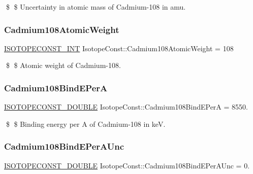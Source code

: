 \$ \$ Uncertainty in atomic mass of Cadmium-\/108 in amu. \mbox{\label{group___isotope_const-_cadmium-_cd108_gadc36c89b4044a011b0975d77445120d3}} 
\subsubsection{\texorpdfstring{Cadmium108\+Atomic\+Weight}{Cadmium108AtomicWeight}}
{\footnotesize\ttfamily \mbox{\hyperlink{group___isotope_const-_macros_ga5f18360b3e99483a35c32d789e62621c}{I\+S\+O\+T\+O\+P\+E\+C\+O\+N\+S\+T\+\_\+\+I\+NT}} Isotope\+Const\+::\+Cadmium108\+Atomic\+Weight = 108}

\$ \$ Atomic weight of Cadmium-\/108. \mbox{\label{group___isotope_const-_cadmium-_cd108_ga8949bc4e472612179144539664686152}} 
\subsubsection{\texorpdfstring{Cadmium108\+Bind\+E\+PerA}{Cadmium108BindEPerA}}
{\footnotesize\ttfamily \mbox{\hyperlink{group___isotope_const-_macros_ga8f45a7272ce02c0b4c65c44636ed719a}{I\+S\+O\+T\+O\+P\+E\+C\+O\+N\+S\+T\+\_\+\+D\+O\+U\+B\+LE}} Isotope\+Const\+::\+Cadmium108\+Bind\+E\+PerA = 8550.}

\$ \$ Binding energy per A of Cadmium-\/108 in keV. \mbox{\label{group___isotope_const-_cadmium-_cd108_gab536d15718df90a1838f502ff0ec3fc6}} 
\subsubsection{\texorpdfstring{Cadmium108\+Bind\+E\+Per\+A\+Unc}{Cadmium108BindEPerAUnc}}
{\footnotesize\ttfamily \mbox{\hyperlink{group___isotope_const-_macros_ga8f45a7272ce02c0b4c65c44636ed719a}{I\+S\+O\+T\+O\+P\+E\+C\+O\+N\+S\+T\+\_\+\+D\+O\+U\+B\+LE}} Isotope\+Const\+::\+Cadmium108\+Bind\+E\+Per\+A\+Unc = 0.}

